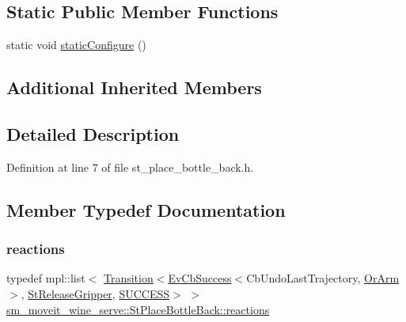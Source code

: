 \subsection*{Static Public Member Functions}
\begin{DoxyCompactItemize}
\item 
static void \hyperlink{structsm__moveit__wine__serve_1_1StPlaceBottleBack_add182dbcdc9631ae59ac6c5b65ca17db}{static\+Configure} ()
\end{DoxyCompactItemize}
\subsection*{Additional Inherited Members}


\subsection{Detailed Description}


Definition at line 7 of file st\+\_\+place\+\_\+bottle\+\_\+back.\+h.



\subsection{Member Typedef Documentation}
\mbox{\label{structsm__moveit__wine__serve_1_1StPlaceBottleBack_a8d88f53703fd785a14c970cdc89f4564}} 
\subsubsection{\texorpdfstring{reactions}{reactions}}
{\footnotesize\ttfamily typedef mpl\+::list$<$ \hyperlink{classsmacc_1_1Transition}{Transition}$<$\hyperlink{structsmacc_1_1EvCbSuccess}{Ev\+Cb\+Success}$<$Cb\+Undo\+Last\+Trajectory, \hyperlink{classsm__moveit__wine__serve_1_1OrArm}{Or\+Arm}$>$, \hyperlink{structsm__moveit__wine__serve_1_1StReleaseGripper}{St\+Release\+Gripper}, \hyperlink{structsmacc_1_1default__transition__tags_1_1SUCCESS}{S\+U\+C\+C\+E\+SS}$>$ $>$ \hyperlink{structsm__moveit__wine__serve_1_1StPlaceBottleBack_a8d88f53703fd785a14c970cdc89f4564}{sm\+\_\+moveit\+\_\+wine\+\_\+serve\+::\+St\+Place\+Bottle\+Back\+::reactions}}



